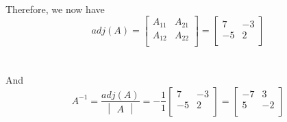\documentclass[prl,twocolumn,showpacs,preprintnumbers,superscriptaddress]{revtex4}
\theoremstyle{plain}
\theoremstyle{definition}
\begin{document}
\begin{widetext}
\\
Therefore, we now have
\[
adj(A) = \begin{bmatrix}    A_{11} & A_{21}  \\     A_{12} & A_{22}  \\ \end{bmatrix} = \begin{bmatrix}    7 & -3 \\   -5 & 2 \\  \end{bmatrix}
\]
\\
\\
And
\[
A^{-1} =   \frac{adj(A)}{\begin{vmatrix} A \end{vmatrix}} = -\frac{1}{1} \begin{bmatrix}   7 & -3 \\     -5 & 2 \\  \end{bmatrix} = \begin{bmatrix}    -7 & 3 \\     5 & -2   \\ \end{bmatrix}
\]
\\
\\
\\
\end{widetext}
\end{document}
